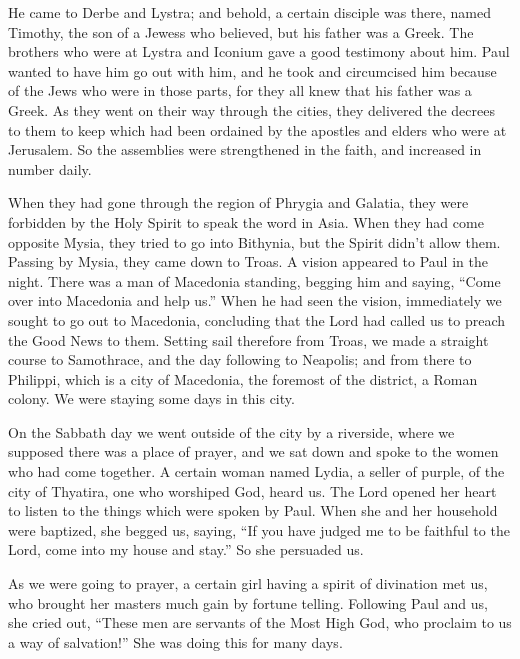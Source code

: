  He came to Derbe and Lystra; and behold, a certain
disciple was there, named Timothy, the son of a Jewess who believed, but
his father was a Greek.  The brothers who were at Lystra
and Iconium gave a good testimony about him.  Paul wanted
to have him go out with him, and he took and circumcised him because of
the Jews who were in those parts, for they all knew that his father was
a Greek.  As they went on their way through the cities,
they delivered the decrees to them to keep which had been ordained by
the apostles and elders who were at Jerusalem.  So the
assemblies were strengthened in the faith, and increased in number
daily.

 When they had gone through the region of Phrygia and
Galatia, they were forbidden by the Holy Spirit to speak the word in
Asia.  When they had come opposite Mysia, they tried to go
into Bithynia, but the Spirit didn't allow them.  Passing
by Mysia, they came down to Troas.  A vision appeared to
Paul in the night. There was a man of Macedonia standing, begging him
and saying, ``Come over into Macedonia and help us.'' 
When he had seen the vision, immediately we sought to go out to
Macedonia, concluding that the Lord had called us to preach the Good
News to them.  Setting sail therefore from Troas, we made
a straight course to Samothrace, and the day following to Neapolis;
 and from there to Philippi, which is a city of
Macedonia, the foremost of the district, a Roman colony. We were staying
some days in this city.

 On the Sabbath day we went outside of the city by a
riverside, where we supposed there was a place of prayer, and we sat
down and spoke to the women who had come together.  A
certain woman named Lydia, a seller of purple, of the city of Thyatira,
one who worshiped God, heard us. The Lord opened her heart to listen to
the things which were spoken by Paul.  When she and her
household were baptized, she begged us, saying, ``If you have judged me
to be faithful to the Lord, come into my house and stay.'' So she
persuaded us.

 As we were going to prayer, a certain girl having a
spirit of divination met us, who brought her masters much gain by
fortune telling.  Following Paul and us, she cried out,
``These men are servants of the Most High God, who proclaim to us a way
of salvation!''  She was doing this for many days.

